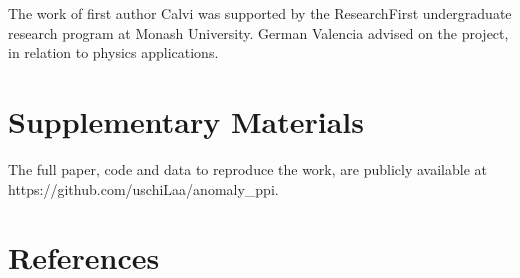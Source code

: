 \documentclass[
  12pt,
]{interact}
\begin{document}
The work of first author Calvi was supported by the ResearchFirst
undergraduate research program at Monash University. German Valencia
advised on the project, in relation to physics applications.

\section*{Supplementary Materials}\label{supplementary-materials}

The full paper, code and data to reproduce the work, are publicly
available at https://github.com/uschiLaa/anomaly\_ppi.

\section*{References}\label{references}
\end{document}
